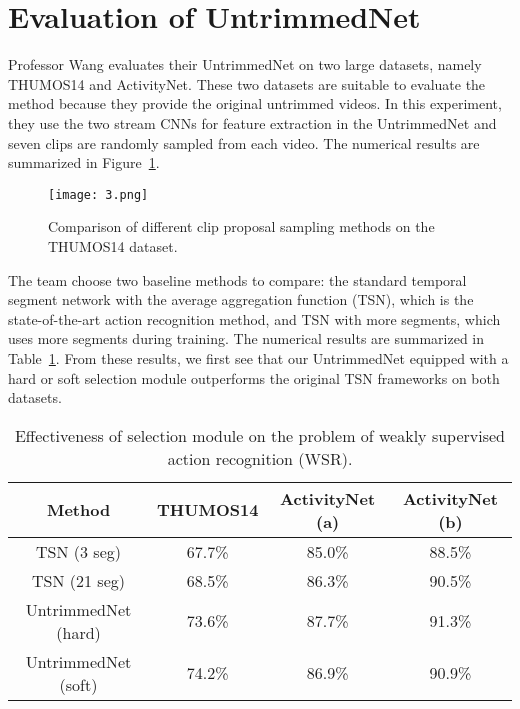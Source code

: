 \documentclass[twocolumn]{article}
\begin{document}
 \section{Evaluation of UntrimmedNet}
   Professor Wang evaluates their UntrimmedNet on two large datasets, namely THUMOS14 and ActivityNet\cite{Heilbron2015ActivityNet}. These two datasets are suitable to evaluate the method because they provide the original untrimmed videos. In this experiment, they use the two stream CNNs for feature extraction in the UntrimmedNet and seven clips are randomly sampled from each video. The numerical results are summarized in Figure~\ref{dataset}.
   \begin{figure}[htbp]
   	\centering
   	\texttt{[image: 3.png]}
   	\caption{Comparison of different clip proposal sampling methods on the THUMOS14 dataset.}\label{dataset}
   \end{figure}

   The team choose two baseline methods to compare: the standard temporal segment network with the average aggregation function (TSN), which is the state-of-the-art action recognition method, and TSN with more segments, which uses more segments during training. The numerical results are summarized in Table~\ref{Effectiveness}. From these results, we first see that our UntrimmedNet equipped with a hard or soft selection module outperforms the original TSN frameworks on both datasets.
   \begin{table}[h]
   	\centering
   	\caption{Effectiveness of selection module on the problem of weakly supervised action recognition (WSR).}\label{Effectiveness}
   	\begin{tabular}{|c|c|c|c|}
   		\hline
   		Method & THUMOS14 & ActivityNet (a) & ActivityNet (b)\\
   		\hline
   		TSN (3 seg)\cite{Wang2016Temporal}  &67.7\% &85.0\%& 88.5\%\\
   		\hline
   		TSN (21 seg) &68.5\%&86.3\%& 90.5\%\\
   		\hline
   		UntrimmedNet (hard) &73.6\%&87.7\%& 91.3\%\\
   		\hline
   		UntrimmedNet (soft)&74.2\%&86.9\%& 90.9\%\\
   		\hline
   	\end{tabular}
   \end{table}
  

	
\end{document}
